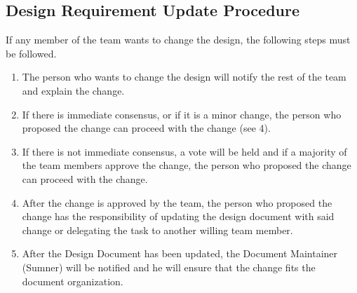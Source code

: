 \documentclass[12pt,titlepage]{article}
\begin{document}
\subsection{Design Requirement Update Procedure}

If any member of the team wants to change the design, the following steps must
be followed.

\begin{enumerate}
    \item The person who wants to change the design will notify the rest of the
        team and explain the change.

    \item If there is immediate consensus, or if it is a minor change, the
        person who proposed the change can proceed with the change (see 4).

    \item If there is not immediate consensus, a vote will be held and if a
        majority of the team members approve the change, the person who proposed
        the change can proceed with the change.

    \item After the change is approved by the team, the person who proposed the
        change has the responsibility of updating the design document with said
        change or delegating the task to another willing team member.

    \item After the Design Document has been updated, the Document Maintainer
        (Sumner) will be notified and he will ensure that the change fits the
        document organization.
\end{enumerate}
\end{document}
